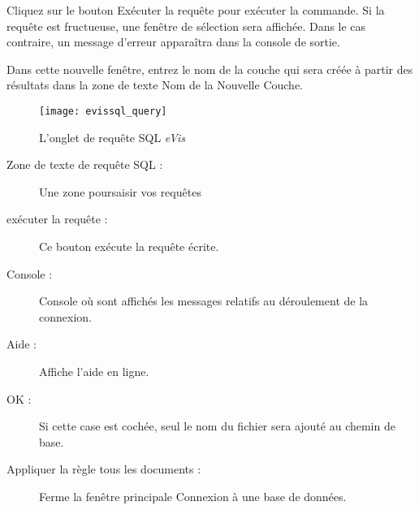 
Cliquez sur le bouton Exécuter la requête pour exécuter la commande. Si la requête est fructueuse, une fenêtre de sélection sera affichée. Dans le cas contraire, un message d'erreur apparaîtra dans la console de sortie.


Dans cette nouvelle fenêtre, entrez le nom de la couche qui sera créée à partir des résultats dans la zone de texte Nom de la Nouvelle Couche.

\begin{figure}[ht]
   \begin{center}
\texttt{[image: evissql\_query]}
\caption{\label{evissql_query}L'onglet de requête SQL \emph{eVis} \nixcaption}
\end{center}
\end{figure}

\begin{description}
\item[Zone de texte de requête SQL :] Une zone poursaisir vos requêtes
\item[exécuter la requête :] Ce bouton exécute la requête écrite.
\item[Console :] Console où sont affichés les messages relatifs au déroulement de la connexion.
\item[Aide :] Affiche l'aide en ligne.
\item[OK :] Si cette case est cochée, seul le nom du fichier sera ajouté au chemin de base.
\item[Appliquer la règle tous les documents :] Ferme la fenêtre principale \og Connexion à une base de données\fg .
\end{description}

